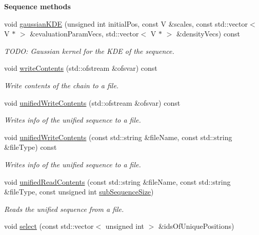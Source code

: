 \begin{Indent}{\bf Sequence methods}
\begin{DoxyCompactItemize}
void \hyperlink{class_q_u_e_s_o_1_1_array_of_sequences_a221a49bf0e054276007dde487dbedfe6}{gaussian\-K\-D\-E} (unsigned int initial\-Pos, const V \&scales, const std\-::vector$<$ V $\ast$ $>$ \&evaluation\-Param\-Vecs, std\-::vector$<$ V $\ast$ $>$ \&density\-Vecs) const 
\begin{DoxyCompactList}\small\item\em T\-O\-D\-O\-: Gaussian kernel for the K\-D\-E of the sequence. \end{DoxyCompactList}\item 
void \hyperlink{class_q_u_e_s_o_1_1_array_of_sequences_a4b1248fe9601ec598797071210760687}{write\-Contents} (std\-::ofstream \&ofsvar) const 
\begin{DoxyCompactList}\small\item\em Write contents of the chain to a file. \end{DoxyCompactList}\item 
void \hyperlink{class_q_u_e_s_o_1_1_array_of_sequences_a20727ea1cc87e2cf81802b7e07eae35f}{unified\-Write\-Contents} (std\-::ofstream \&ofsvar) const 
\begin{DoxyCompactList}\small\item\em Writes info of the unified sequence to a file. \end{DoxyCompactList}\item 
void \hyperlink{class_q_u_e_s_o_1_1_array_of_sequences_af4ab2f575230715be16fff5ae9bb4759}{unified\-Write\-Contents} (const std\-::string \&file\-Name, const std\-::string \&file\-Type) const 
\begin{DoxyCompactList}\small\item\em Writes info of the unified sequence to a file. \end{DoxyCompactList}\item 
void \hyperlink{class_q_u_e_s_o_1_1_array_of_sequences_a3fbe0f679fa8828e27dadb89a9fe3eaa}{unified\-Read\-Contents} (const std\-::string \&file\-Name, const std\-::string \&file\-Type, const unsigned int \hyperlink{class_q_u_e_s_o_1_1_array_of_sequences_a007d00d2398007b9bac82ed23eedb1e2}{sub\-Sequence\-Size})
\begin{DoxyCompactList}\small\item\em Reads the unified sequence from a file. \end{DoxyCompactList}\item 
void \hyperlink{class_q_u_e_s_o_1_1_array_of_sequences_a643996eaf9db7e40a423c06ae5cb881a}{select} (const std\-::vector$<$ unsigned int $>$ \&ids\-Of\-Unique\-Positions)

\end{DoxyCompactItemize}
\end{Indent}
